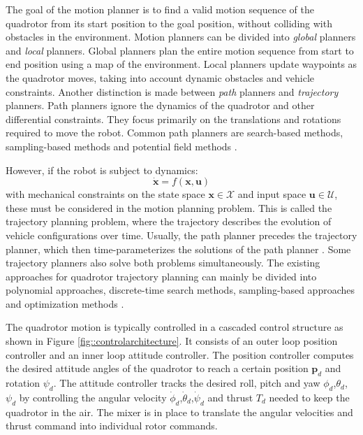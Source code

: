 The goal of the motion planner is to find a valid motion sequence of the quadrotor from its start position to the goal position, without colliding with obstacles in the environment. Motion planners can be divided into \textit{global} planners and \textit{local} planners. Global planners plan the entire motion sequence from start to end position using a map of the environment. Local planners update waypoints as the quadrotor moves, taking into account dynamic obstacles and vehicle constraints. Another distinction is made between \textit{path} planners and \textit{trajectory} planners. Path planners ignore the dynamics of the quadrotor and other differential constraints. They focus primarily on the translations and rotations required to move the robot. Common path planners are search-based methods, sampling-based methods and potential field methods \cite{quan2020survey}. 

However, if the robot is subject to dynamics:
\begin{equation}
\dot{\mathbf{x}}=f(\mathbf{x}, \mathbf{u})
\end{equation}
with mechanical constraints on the state space $\mathbf{x} \in \mathcal{X}$ and input space $\mathbf{u} \in \mathcal{U}$, these must be considered in the motion planning problem. This is called the trajectory planning problem, where the trajectory describes the evolution of vehicle configurations over time. Usually, the path planner precedes the trajectory planner, which then time-parameterizes the solutions of the path planner \cite{goerzen2010survey}. Some trajectory planners also solve both problems simultaneously. The existing approaches for quadrotor trajectory planning can mainly be divided into polynomial approaches, discrete-time search methods, sampling-based approaches and optimization methods \cite{penicka2022minimum}.

The quadrotor motion is typically controlled in a cascaded control structure as shown in Figure \ref{fig::controlarchitecture}. It consists of an outer loop position controller and an inner loop attitude controller. The position controller computes the desired attitude angles of the quadrotor to reach a certain position $\mathbf{p}_d$ and rotation $\psi_d$. The attitude controller tracks the desired roll, pitch and yaw $\phi_d$,$\theta_d$,$\psi_d$ by controlling the angular velocity $\dot{\phi}_d$,$\dot{\theta}_d$,$\dot{\psi}_d$ and thrust $T_d$ needed to keep the quadrotor in the air. The mixer is in place to translate the angular velocities and thrust command into individual rotor commands. 

